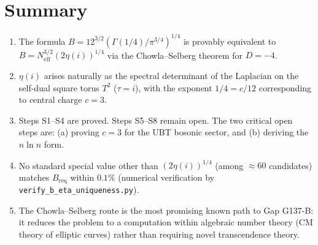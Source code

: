 \documentclass[12pt,a4paper]{article}
\theoremstyle{definition}
\theoremstyle{remark}
\begin{document}
\section{Summary}
\label{sec:cs:summary}

\begin{tcolorbox}[colback=blue!4!white,colframe=blue!50!black,
                  title=Summary of Chowla--Selberg Route]
\begin{enumerate}
  \item The formula $B = 12^{3/2}(\Gamma(1/4)/\pi^{3/4})^{1/4}$ is
        provably equivalent to $B = N_{\mathrm{eff}}^{3/2}(2\eta(i))^{1/4}$
        via the Chowla--Selberg theorem for $D=-4$.

  \item $\eta(i)$ arises naturally as the spectral determinant of the
        Laplacian on the self-dual square torus $T^2$ ($\tau=i$), with the
        exponent $1/4 = c/12$ corresponding to central charge $c=3$.

  \item Steps S1--S4 are proved.  Steps S5--S8 remain open.  The two
        critical open steps are: (a) proving $c=3$ for the UBT bosonic
        sector, and (b) deriving the $n\ln n$ form.

  \item No standard special value other than $(2\eta(i))^{1/4}$ (among
        $\approx 60$ candidates) matches $B_{\mathrm{req}}$ within $0.1\%$
        (numerical verification by \texttt{verify\_b\_eta\_uniqueness.py}).

  \item The Chowla--Selberg route is the most promising known path to
        Gap G137-B: it reduces the problem to a computation within algebraic
        number theory (CM theory of elliptic curves) rather than requiring
        novel transcendence theory.
\end{enumerate}
\end{tcolorbox}

\ifdefined\INCLUDEMODE
\else
  
\end{document}
